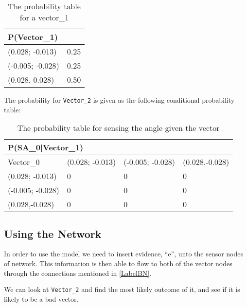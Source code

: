\begin{center}
\begin{table}[H]
\label{Vector0_table}
\begin{tabular}{|l|l|}
\hline
P(Vector\_1) &\\ \hline
(0.028; -0.013) & 0.25   \\ \hline 
(-0.005; -0.028) & 0.25  \\ \hline
(0.028,-0.028)   & 0.50  \\ \hline
\end{tabular}
\caption{The probability table for a vector\_1}
\end{table}
\end{center}

The probability for \texttt{Vector\_2} is given as the following conditional
probability table: 
\begin{center}
\begin{table}[H]
\label{SAtable}
\begin{tabular}{|l|l|l|l|}
\hline
\multicolumn{4}{|l|}{P(SA\_0|Vector\_1)} \\ \hline
Vector\_0     & (0.028; -0.013) & (-0.005; -0.028) & (0.028,-0.028)  \\\hline   
(0.028; -0.013)   & 0 & 0    & 0    \\ \hline 
(-0.005; -0.028)    & 0 & 0    & 0    \\ \hline
(0.028,-0.028)   & 0    & 0    & 0   \\ \hline
\end{tabular}
\caption{The probability table for sensing the angle given the vector}
\end{table}
\end{center}


\subsection{Using the Network}

In order to use the model we need to insert evidence, ``e'', unto the sensor
nodes of network. This information is then able to flow to both of the vector
nodes through the connections mentioned in \autoref{LabelBN}.


We can look at \texttt{Vector\_2} and find the most likely outcome of it, and
see if it is likely to be a bad vector.


